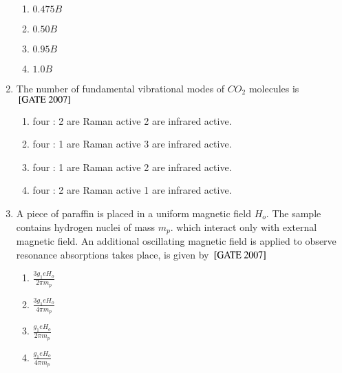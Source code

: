 \documentclass[journal]{IEEEtran}
\begin{document}
\begin{enumerate}
\begin{multicols}{4}
\begin{enumerate}
    \item $0.475B$
    \item $0.50 B$
    \item $0.95 B$
    \item $1.0 B$
    
\end{enumerate}
\end{multicols}
\item The number of fundamental vibrational modes of $CO_2$ molecules is \hfill{${}\left[\text{GATE 2007}\right]$} 
\begin{enumerate}
    \item four : 2 are Raman active 2 are infrared active.
     \item four : 1 are Raman active 3 are infrared active.
      \item four : 1 are Raman active 2 are infrared active.
       \item four : 2 are Raman active 1 are infrared active.
    
\end{enumerate}
\item A piece of paraffin is placed in a uniform magnetic field $H_o$. The sample contains hydrogen nuclei of mass $m_p$. which interact only with external magnetic field. An additional oscillating magnetic field is applied to observe resonance absorptions takes place, is given by \hfill{${}\left[\text{GATE 2007}\right]$} 
\begin{multicols}{4}
\begin{enumerate}
    \item $\frac{3g_1 eH_o}{2\pi m_p}$
    \item $\frac{3g_1 eH_o}{4\pi m_p}$
    \item $\frac{g_1 eH_o}{2\pi m_p}$
    \item $\frac{g_1 eH_o}{4\pi m_p}$
\end{enumerate}
\end{multicols}
\end{enumerate}
\end{document}
